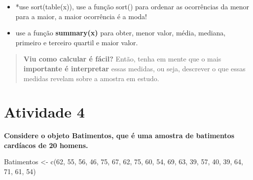 \documentclass[
]{book}
\newenvironment{Shaded}{\begin{snugshade}}{\end{snugshade}}
\newcommand{\DecValTok}[1]{\textcolor[rgb]{0.00,0.00,0.81}{#1}}
\newcommand{\FunctionTok}[1]{\textcolor[rgb]{0.00,0.00,0.00}{#1}}
\newcommand{\NormalTok}[1]{#1}
\newcommand{\OtherTok}[1]{\textcolor[rgb]{0.56,0.35,0.01}{#1}}
\begin{document}
\begin{itemize}
\item
  *use sort(table(x)), use a função sort() para ordenar as ocorrências da menor para a maior, a maior ocorrência é a moda!
\item
  use a função \textbf{summary(x)} para obter, menor valor, média, mediana, primeiro e terceiro quartil e maior valor.
\end{itemize}

\begin{quote}
\textbf{Viu como calcular é fácil?} Então, tenha em mente que o mais \textbf{importante é interpretar} essas medidas, ou seja, descrever o que essas medidas revelam sobre a amostra em estudo.
\end{quote}

\hypertarget{atividade-4}{%
\section{Atividade 4}\label{atividade-4}}

\textbf{Considere o objeto Batimentos, que é uma amostra de batimentos cardíacos de 20 homens.}

\begin{Shaded}
\begin{Highlighting}[]
\NormalTok{Batimentos }\OtherTok{\textless{}{-}} \FunctionTok{c}\NormalTok{(}\DecValTok{62}\NormalTok{, }\DecValTok{55}\NormalTok{, }\DecValTok{56}\NormalTok{, }\DecValTok{46}\NormalTok{, }\DecValTok{75}\NormalTok{, }\DecValTok{67}\NormalTok{, }\DecValTok{62}\NormalTok{, }\DecValTok{75}\NormalTok{, }\DecValTok{60}\NormalTok{, }\DecValTok{54}\NormalTok{, }\DecValTok{69}\NormalTok{, }\DecValTok{63}\NormalTok{, }\DecValTok{39}\NormalTok{, }\DecValTok{57}\NormalTok{, }\DecValTok{40}\NormalTok{, }\DecValTok{39}\NormalTok{, }\DecValTok{64}\NormalTok{, }\DecValTok{71}\NormalTok{, }\DecValTok{61}\NormalTok{, }\DecValTok{54}\NormalTok{)}
\end{Highlighting}
\end{Shaded}
\end{document}
